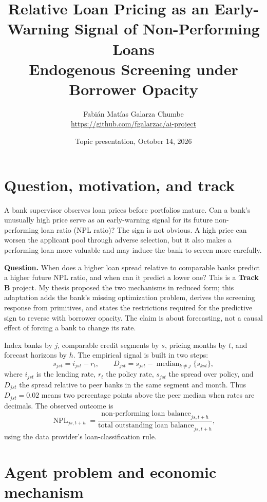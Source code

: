 \documentclass[11pt]{article}
\title{Relative Loan Pricing as an Early-Warning Signal of Non-Performing Loans\\
\large Endogenous Screening under Borrower Opacity}
\author{Fabián Matías Galarza Chumbe\\
\small\url{https://github.com/fgalarzac/ai-project}}
\date{Topic presentation, October 14, 2026}
\begin{document}
\maketitle
\vspace{-1.2em}

\section{Question, motivation, and track}

A bank supervisor observes loan prices before portfolios mature. Can a bank's
unusually high price serve as an early-warning signal for its future
non-performing loan ratio (NPL ratio)? The sign is not obvious. A high price
can worsen the applicant pool through adverse selection, but it also makes a
performing loan more valuable and may induce the bank to screen more carefully.

\textbf{Question.} When does a higher loan spread relative to comparable banks
predict a higher future NPL ratio, and when can it predict a lower one? This is
a \textbf{Track B} project. My thesis proposed the two mechanisms in reduced
form; this adaptation adds the bank's missing optimization problem, derives
the screening response from primitives, and states the restrictions required
for the predictive sign to reverse with borrower opacity. The claim is about
forecasting, not a causal effect of forcing a bank to change its rate.

Index banks by \(j\), comparable credit segments by \(s\), pricing months by
\(t\), and forecast horizons by \(h\). The empirical signal is built in two
steps:
\begin{equation}
s_{jst}=i_{jst}-r_t,
\qquad
D_{jst}=s_{jst}-\operatorname{median}_{k\ne j}\{s_{kst}\},
\label{eq:signal}
\end{equation}
where \(i_{jst}\) is the lending rate, \(r_t\) the policy rate, \(s_{jst}\)
the spread over policy, and \(D_{jst}\) the spread relative to peer banks in
the same segment and month. Thus \(D_{jst}=0.02\) means two percentage points
above the peer median when rates are decimals. The observed outcome is
\begin{equation}
\operatorname{NPL}_{js,t+h}
=\frac{\text{non-performing loan balance}_{js,t+h}}
       {\text{total outstanding loan balance}_{js,t+h}},
\label{eq:npl}
\end{equation}
using the data provider's loan-classification rule.

\section{Agent problem and economic mechanism}
\end{document}

